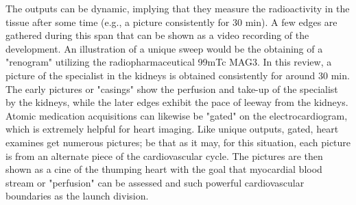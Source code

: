 \documentclass[12pt]{article}
\begin{document}
\par
The outputs can be dynamic, implying that they measure the radioactivity in the tissue after some time (e.g., a picture consistently for 30 min). A few edges are gathered during this span that can be shown as a video recording of the development. An illustration of a unique sweep would be the obtaining of a "renogram" utilizing the radiopharmaceutical 99mTc MAG3. In this review, a picture of the specialist in the kidneys is obtained consistently for around 30 min. The early pictures or "casings" show the perfusion and take-up of the specialist by the kidneys, while the later edges exhibit the pace of leeway from the kidneys. Atomic medication acquisitions can likewise be "gated" on the electrocardiogram, which is extremely helpful for heart imaging. Like unique outputs, gated, heart examines get numerous pictures; be that as it may, for this situation, each picture is from an alternate piece of the cardiovascular cycle. The pictures are then shown as a cine of the thumping heart with the goal that myocardial blood stream or "perfusion" can be assessed and such powerful cardiovascular boundaries as the launch division.
\end{document}
